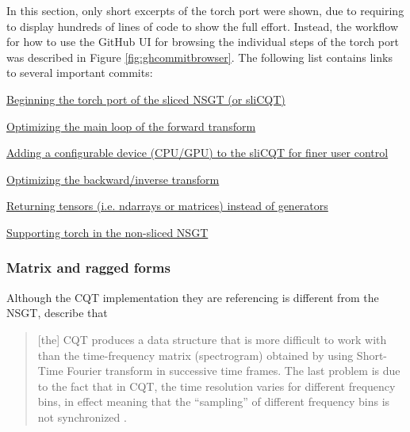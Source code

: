 \documentclass[report.tex]{subfiles}
\begin{document}
In this section, only short excerpts of the torch port were shown, due to requiring to display hundreds of lines of code to show the full effort. Instead, the workflow for how to use the GitHub UI for browsing the individual steps of the torch port was described in Figure \ref{fig:ghcommitbrowser}. The following list contains links to several important commits:

\begin{tight_enumerate}
	 \item
		 \href{https://github.com/sevagh/nsgt/commit/ce9785d40d1053fcffc72115d5fbdcb28d44bf7c}{Beginning the torch port of the sliced NSGT (or sliCQT)}
	 \item
		 \href{https://github.com/sevagh/nsgt/commit/49a70d112ba4091d271a9438a8c38cf380ce62b4}{Optimizing the main loop of the forward transform}
	 \item
		 \href{https://github.com/sevagh/nsgt/commit/2d41fe002d95e4dbd1cdb76ef24aa03c95cfbe46}{Adding a configurable device (CPU/GPU) to the sliCQT for finer user control}
	 \item
		 \href{https://github.com/sevagh/nsgt/commit/9552aa1eb0735e93ce91b648a5b7f629066693b3}{Optimizing the backward/inverse transform}
	 \item
		 \href{https://github.com/sevagh/nsgt/commit/1a5886bced951af132ab8659d30a565bcade87b2}{Returning tensors (i.e. ndarrays or matrices) instead of generators}
	 \item
		 \href{https://github.com/sevagh/nsgt/commit/8d873f7dc8053c553664dcc5c0816eaf3e1ddae0}{Supporting torch in the non-sliced NSGT}
\end{tight_enumerate}

\newpagefill

\subsubsection{Matrix and ragged forms}
\label{sec:matrixvragged}

Although the CQT implementation they are referencing is different from the NSGT, \citeauthor{klapuricqt} describe that
\begin{quote}
	[the] CQT produces a data structure that is more difficult to work with than the time-frequency matrix (spectrogram) obtained by using Short-Time Fourier transform in successive time frames. The last problem is due to the fact that in CQT, the time resolution varies for different frequency bins, in effect meaning that the ``sampling'' of different frequency bins is not synchronized \parencite[1]{klapuricqt}.
\end{quote}
\end{document}
